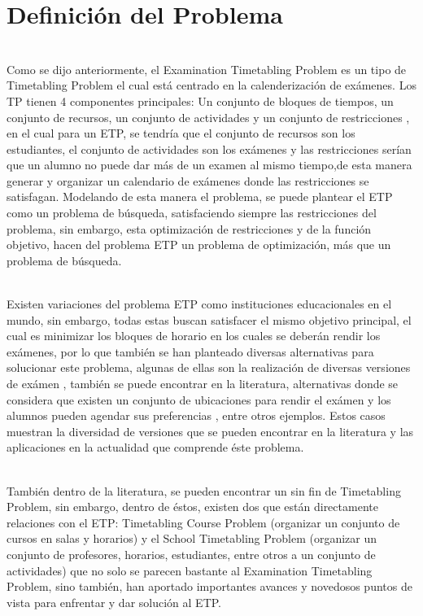\documentclass[letter, 10pt]{article}
\begin{document}
\section{Definici\'on del Problema} \label{Definición}
\\
Como se dijo anteriormente, el Examination Timetabling Problem es un tipo de Timetabling Problem el cual está centrado en la calenderización de exámenes. Los TP tienen 4 componentes principales: Un conjunto de bloques de tiempos, un conjunto de recursos, un conjunto de actividades y un conjunto de restricciones \cite{Cita5}, en el cual para un ETP, se tendría que el conjunto de recursos son los estudiantes, el conjunto de actividades son los exámenes y las restricciones serían que un alumno no puede dar más de un examen al mismo tiempo,de esta manera generar y organizar un calendario de exámenes donde las restricciones se satisfagan. Modelando de esta manera el problema, se puede plantear el ETP como un problema de búsqueda, satisfaciendo siempre las restricciones del problema, sin embargo, esta optimización de restricciones y de la función objetivo, hacen del problema ETP un problema de optimización, más que un problema de búsqueda.
\begin{itemize}
\end{itemize}
\\
Existen variaciones del problema ETP como instituciones educacionales en el mundo, sin embargo, todas estas buscan satisfacer el mismo objetivo principal, el cual es minimizar los bloques de horario en los cuales se deberán rendir los exámenes, por lo que también se han planteado diversas alternativas para solucionar este problema, algunas de ellas son la realización de diversas versiones de exámen \cite{Cita1}, también se puede encontrar en la literatura, alternativas donde se considera que existen un conjunto de ubicaciones para rendir el exámen y los alumnos pueden agendar sus preferencias \cite{Cita6}, entre otros ejemplos. Estos casos muestran la diversidad de versiones que se pueden encontrar en la literatura y las aplicaciones en la actualidad que comprende éste problema.
\begin{itemize}
\end{itemize}
\\
También dentro de la literatura, se pueden encontrar un sin fin de Timetabling Problem, sin embargo, dentro de éstos, existen dos que están directamente relaciones con el ETP: Timetabling Course Problem (organizar un conjunto de cursos en salas y horarios) y el School Timetabling Problem (organizar un conjunto de profesores, horarios, estudiantes, entre otros a un conjunto de actividades) que no solo se parecen bastante al Examination Timetabling Problem, sino también, han aportado importantes avances y novedosos puntos de vista para enfrentar y dar solución al ETP.
\end{document}
